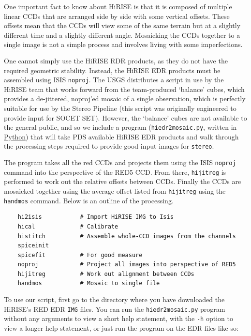 One important fact to know about HiRISE is that it is composed of
multiple linear CCDs that are arranged side by side with some vertical
offsets. These offsets mean that the CCDs will view some of the same
terrain but at a slightly different time and a slightly different
angle. Mosaicking the CCDs together to a single image is not a simple
process and involves living with some imperfections.

One cannot simply use the \ac{HiRISE} RDR products, as they do not
have the required geometric stability.  Instead, the \ac{HiRISE}
EDR products must be assembled using \ac{ISIS} \texttt{noproj}.
The USGS distributes a script in use by the \ac{HiRISE} team that
works forward from the team-produced `balance' cubes, which provides
a de-jittered, noproj'ed mosaic of a single observation, which is
perfectly suitable for use by the Stereo Pipeline (this script was
originally engineered to provide input for SOCET SET).  However,
the `balance' cubes are not available to the general public, and
so we include a program (\texttt{hiedr2mosaic.py}, written in
\href{http://www.python.org}{Python}) that will take \ac{PDS}
available \ac{HiRISE} EDR products and walk through the processing
steps required to provide good input images for \texttt{stereo}.

The program takes all the red CCDs and projects them using the \ac{ISIS}
{\tt noproj} command into the perspective of the RED5 CCD. From there,
{\tt hijitreg} is performed to work out the relative offsets between
CCDs. Finally the CCDs are mosaicked together using the average
offset listed from {\tt hijitreg} using the {\tt handmos} command.
Below is an outline of the processing.

\begin{verbatim}
    hi2isis           # Import HiRISE IMG to Isis
    hical             # Calibrate
    histitch          # Assemble whole-CCD images from the channels
    spiceinit
    spicefit          # For good measure
    noproj            # Project all images into perspective of RED5
    hijitreg          # Work out alignment between CCDs
    handmos           # Mosaic to single file
\end{verbatim}

To use our script, first go to the directory where you have downloaded
the HiRISE's RED EDR \texttt{IMG} files. You can run the 
\texttt{hiedr2mosaic.py} program without any arguments to view a short
help statement, with the \texttt{-h} option to view a longer help statement,
or just run the program on the EDR files like so:

